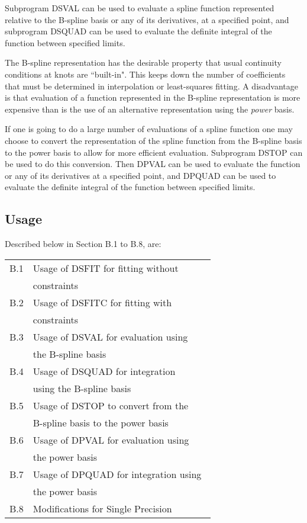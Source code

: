 \documentclass[twoside]{MATH77}
\begin{document}
Subprogram DSVAL can be used to evaluate a spline function represented
relative to the B-spline basis or any of its derivatives, at a specified
point, and subprogram DSQUAD can be used to evaluate the definite integral
of the function between specified limits.

The B-spline representation has the desirable property that usual continuity
conditions at knots are ``built-in". This keeps down the number of
coefficients that must be determined in interpolation or least-squares
fitting. A disadvantage is that evaluation of a function represented in the
B-spline representation is more expensive than is the use of an alternative
representation using the {\em power} basis.

If one is going to do a large number of evaluations of a spline function one
may choose to convert the representation of the spline function from the
B-spline basis to the power basis to allow for more efficient evaluation.
Subprogram DSTOP can be used to do this conversion. Then DPVAL can be used
to evaluate the function or any of its derivatives at a specified point, and
DPQUAD can be used to evaluate the definite integral of the function between
specified limits.

\subsection{Usage}

Described below in Section B.1 to B.8, are:

\begin{tabular*}{3.3in}{ll}
B.1 & Usage of DSFIT for fitting without\\
 & constraints \dotfill \pageref {dsfit}\\
B.2 &  Usage of DSFITC for fitting with\\
 & constraints \dotfill \pageref {dsfitc}\\
B.3 & Usage of DSVAL for evaluation using\\
 & the B-spline basis \dotfill \pageref{dsval}\\
B.4 & Usage of DSQUAD for integration\\
 & using the B-spline basis \dotfill \pageref{dsquad}\\
B.5 & Usage of DSTOP to convert from the\\
 & B-spline basis to the power basis \dotfill \pageref{dsquad}\\
B.6 & Usage of DPVAL for evaluation using\\
 & the power basis \dotfill \pageref{dpval}\\
B.7 & Usage of DPQUAD for integration using\quad \quad ~\\
 & the power basis \dotfill \pageref{dpquad}\\
B.8 & Modifications for Single Precision \dotfill \pageref{modsp}
\end{tabular*}
\end{document}
